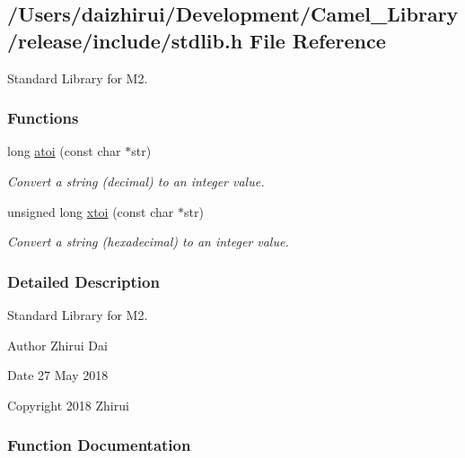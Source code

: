 \hypertarget{a00032}{}\subsection{/\+Users/daizhirui/\+Development/\+Camel\+\_\+\+Library/release/include/stdlib.h File Reference}
\label{a00032}


Standard Library for M2.  


\subsubsection*{Functions}
\begin{DoxyCompactItemize}
\item 
long \mbox{\hyperlink{a00032_a36f90d5de53f568b0fc5266ce013b9c5}{atoi}} (const char $\ast$str)
\begin{DoxyCompactList}\small\item\em Convert a string (decimal) to an integer value. \end{DoxyCompactList}\item 
unsigned long \mbox{\hyperlink{a00032_a9d6165da864d16ad50c13690c1e7d7ea}{xtoi}} (const char $\ast$str)
\begin{DoxyCompactList}\small\item\em Convert a string (hexadecimal) to an integer value. \end{DoxyCompactList}\end{DoxyCompactItemize}


\subsubsection{Detailed Description}
Standard Library for M2. 

\begin{DoxyAuthor}{Author}
Zhirui Dai 
\end{DoxyAuthor}
\begin{DoxyDate}{Date}
27 May 2018 
\end{DoxyDate}
\begin{DoxyCopyright}{Copyright}
2018 Zhirui 
\end{DoxyCopyright}


\subsubsection{Function Documentation}
\mbox{\label{a00032_a36f90d5de53f568b0fc5266ce013b9c5}} 
